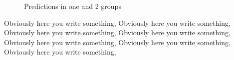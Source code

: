 \documentclass{article}
\begin{document}
\begin{figure}[ht]
    \centering
    \quad
    \quad
    \caption{Predictions in one and 2 groups}
\end{figure}

Obviously here you write something, Obviously here you write something, Obviously here you write something, Obviously here you write something, Obviously here you write something, Obviously here you write something, Obviously here you write something, 
\end{document}
